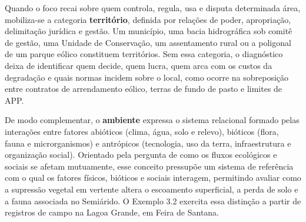 Quando o foco recai sobre quem controla, regula, usa e disputa determinada área, mobiliza-se a categoria \textbf{território}, definida por relações de poder, apropriação, delimitação jurídica e gestão. Um município, uma bacia hidrográfica sob comitê de gestão, uma Unidade de Conservação, um assentamento rural ou a poligonal de um parque eólico constituem territórios. Sem essa categoria, o diagnóstico deixa de identificar quem decide, quem lucra, quem arca com os custos da degradação e quais normas incidem sobre o local, como ocorre na sobreposição entre contratos de arrendamento eólico, terras de fundo de pasto e limites de APP.

De modo complementar, o \textbf{ambiente} expressa o sistema relacional formado pelas interações entre fatores abióticos (clima, água, solo e relevo), bióticos (flora, fauna e microrganismos) e antrópicos (tecnologia, uso da terra, infraestrutura e organização social). Orientado pela pergunta de como os fluxos ecológicos e sociais se afetam mutuamente, esse conceito pressupõe um sistema de referência com o qual os fatores físicos, bióticos e sociais interagem, permitindo avaliar como a supressão vegetal em vertente altera o escoamento superficial, a perda de solo e a fauna associada no Semiárido. O Exemplo 3.2 exercita essa distinção a partir de registros de campo na Lagoa Grande, em Feira de Santana.

